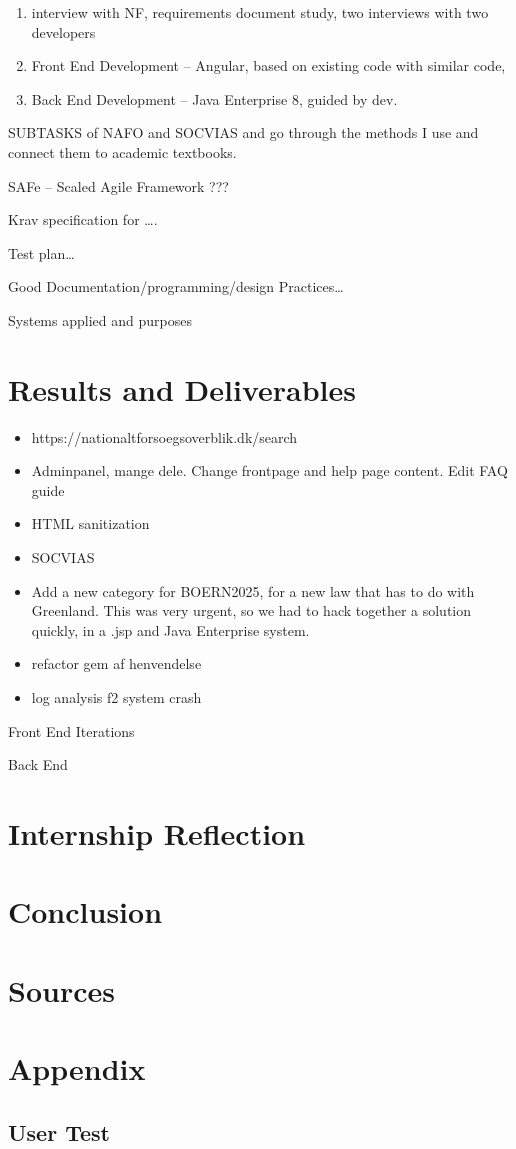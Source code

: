 \documentclass[../main.tex]{subfiles}
\begin{document}
\begin{enumerate}
\item interview with NF, requirements document study, two interviews with two developers 
\item Front End Development – Angular, based on existing code with similar code,  
\item Back End Development – Java Enterprise 8, guided by dev. 
\end{enumerate}

SUBTASKS of NAFO and SOCVIAS and go through the methods I use and connect them to academic textbooks.  

SAFe – Scaled Agile Framework ??? 

Krav specification for …. 

Test plan… 

Good Documentation/programming/design Practices… 

Systems applied and purposes 


\section{Results and Deliverables}

\begin{itemize}
    \item https://nationaltforsoegsoverblik.dk/search 
    \item Adminpanel, mange dele. Change frontpage and help page content. Edit FAQ guide 
    \item HTML sanitization 
    \item SOCVIAS 
    \item Add a new category for BOERN2025, for a new law that has to do with Greenland. This was very urgent, so we had to hack together a solution quickly, in a .jsp and Java Enterprise system. 
    \item refactor gem af henvendelse
    \item log analysis f2 system crash
\end{itemize}


Front End Iterations 

Back End 

\section{Internship Reflection}


\section{Conclusion}


\section{Sources}

\section{Appendix}
\label{sec:appendix}

\subsection{User Test}
\label{sec:user_test}
\end{document}
